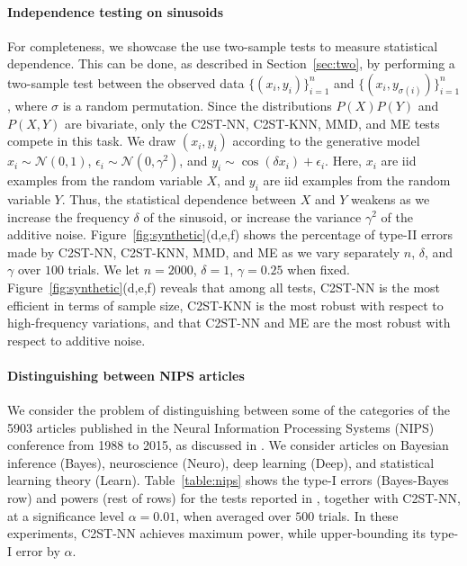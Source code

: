 \documentclass[a4paper]{article}
\begin{document}
  \paragraph{Independence testing on sinusoids} For completeness, we showcase
  the use two-sample tests to measure statistical dependence. This can be done,
  as described in Section~\ref{sec:two}, by performing a two-sample test
  between the observed data
  $\{(x_i,y_i)\}_{i=1}^n$ and $\{(x_i,y_{\sigma(i)})\}_{i=1}^n$, where $\sigma$
  is a random permutation. Since the distributions $P(X)P(Y)$ and $P(X,Y)$ are
  bivariate, only the C2ST-NN,
  C2ST-KNN, MMD, and ME tests compete in this task.  We draw $(x_i,
  y_i)$ according to the generative model $x_i \sim \mathcal{N}(0,1)$,
  $\epsilon_i \sim \mathcal{N}(0,\gamma^2)$, and $y_i \sim \cos(\delta x_i) +
  \epsilon_i$.  Here, $x_i$ are iid examples from the random variable $X$, and
  $y_i$ are iid examples from the random variable $Y$. Thus, the statistical
  dependence between $X$ and $Y$ weakens as we increase the frequency $\delta$ of
  the sinusoid, or increase the variance $\gamma^2$ of the additive noise.
  Figure~\ref{fig:synthetic}(d,e,f) shows the percentage of type-II errors made by C2ST-NN,
  C2ST-KNN, MMD, and ME as we vary separately $n$, $\delta$, and $\gamma$ over $100$ trials.
  We let $n = 2000$, $\delta = 1$, $\gamma = 0.25$ when fixed.
  Figure~\ref{fig:synthetic}(d,e,f) reveals that among all tests, C2ST-NN is
  the most efficient in terms of sample size, C2ST-KNN is the most robust with
  respect to high-frequency variations, and that C2ST-NN and ME are the most
  robust with respect to additive noise.

  \paragraph{Distinguishing between NIPS articles} We consider the problem of
  distinguishing between some of the categories of the 5903 articles published in
  the Neural Information Processing Systems (NIPS) conference from 1988 to
  2015, as discussed in \citet{metests}.
  We consider articles on Bayesian inference (Bayes), neuroscience (Neuro),
  deep learning (Deep), and statistical learning theory (Learn).
  Table~\ref{table:nips} shows the type-I errors (Bayes-Bayes row) and
  powers (rest of rows) for the tests reported in
  \citep{metests}, together with C2ST-NN, at a significance level $\alpha =
  0.01$, when averaged over $500$ trials. In these experiments, C2ST-NN
  achieves maximum power, while upper-bounding its type-I error by $\alpha$.
\end{document}
